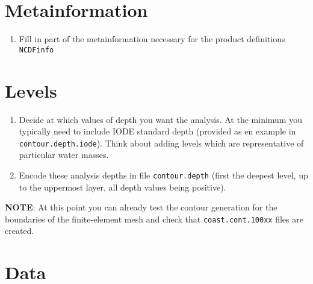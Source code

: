 \documentclass[8pt,a4paper,notitlepage]{book}
\begin{document}
\section{Metainformation}

\begin{enumerate}
\item Fill in part of the metainformation necessary for the product definitions {\tt NCDFinfo}
\end{enumerate}


\section{Levels}

\begin{enumerate}
\item Decide at which values of depth you want the analysis. At the minimum you typically need to include IODE standard depth (provided as en example in {\tt contour.depth.iode}). Think about adding levels which are representative of particular water masses.
\item Encode these analysis depths  in file {\tt contour.depth} (first the deepest level, up to the uppermost layer, all depth values being positive).
\end{enumerate}

{\bf NOTE}: At this point you can already test the contour generation for the boundaries of the finite-element mesh and check that {\tt coast.cont.100xx} files are created.

\section{Data}
\end{document}
